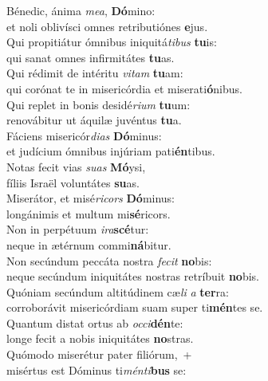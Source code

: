 \evenverse Bénedic, ánima \textit{me}\textit{a}, \textbf{Dó}mino:~\*\\
\evenverse et noli oblivísci omnes retributiónes \textbf{e}jus.\\
\oddverse Qui propitiátur ómnibus iniquitá\textit{ti}\textit{bus} \textbf{tu}is:~\*\\
\oddverse qui sanat omnes infirmitátes \textbf{tu}as.\\
\evenverse Qui rédimit de intéritu \textit{vi}\textit{tam} \textbf{tu}am:~\*\\
\evenverse qui corónat te in misericórdia et miserati\textbf{ó}nibus.\\
\oddverse Qui replet in bonis desidé\textit{ri}\textit{um} \textbf{tu}um:~\*\\
\oddverse renovábitur ut áquilæ juvéntus \textbf{tu}a.\\
\evenverse Fáciens misericór\textit{di}\textit{as} \textbf{Dó}minus:~\*\\
\evenverse et judícium ómnibus injúriam pati\textbf{én}tibus.\\
\oddverse Notas fecit vias \textit{su}\textit{as} \textbf{Mó}ysi,~\*\\
\oddverse fíliis Israël voluntátes \textbf{su}as.\\
\evenverse Miserátor, et misé\textit{ri}\textit{cors} \textbf{Dó}minus:~\*\\
\evenverse longánimis et multum mi\textbf{sé}ricors.\\
\oddverse Non in perpétuum \textit{i}\textit{ra}\textbf{scé}tur:~\*\\
\oddverse neque in ætérnum commi\textbf{ná}bitur.\\
\evenverse Non secúndum peccáta nostra \textit{fe}\textit{cit} \textbf{no}bis:~\*\\
\evenverse neque secúndum iniquitátes nostras retríbuit \textbf{no}bis.\\
\oddverse Quóniam secúndum altitúdinem cæ\textit{li} \textit{a} \textbf{ter}ra:~\*\\
\oddverse corroborávit misericórdiam suam super ti\textbf{mén}tes se.\\
\evenverse Quantum distat ortus ab \textit{oc}\textit{ci}\textbf{dén}te:~\*\\
\evenverse longe fecit a nobis iniquitátes \textbf{no}stras.\\
\oddverse Quómodo miserétur pater filiórum,~+\\
\oddverse  misértus est Dóminus ti\textit{mén}\textit{ti}\textbf{bus} se:~\*\\
